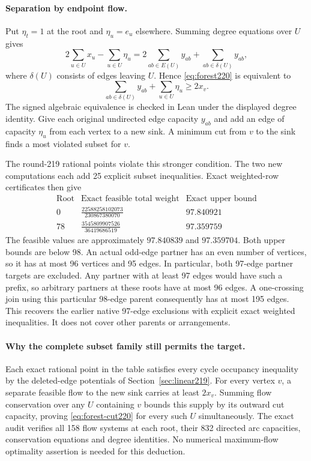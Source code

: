 \documentclass[11pt,a4paper]{article}
\theoremstyle{definition}
\theoremstyle{remark}
\begin{document}
\paragraph{Separation by endpoint flow.}
Put $\eta_t=1$ at the root and $\eta_u=e_u$ elsewhere. Summing degree
equations over $U$ gives
\[
2\sum_{u\in U}x_u-\sum_{u\in U}\eta_u
=2\sum_{ab\in E(U)}y_{ab}+\sum_{ab\in\delta(U)}y_{ab},
\]
where $\delta(U)$ consists of edges leaving $U$. Hence
\eqref{eq:forest220} is equivalent to
\begin{equation}\label{eq:forest-cut220}
\sum_{ab\in\delta(U)}y_{ab}+\sum_{u\in U}\eta_u\ge2x_v.
\end{equation}
The signed algebraic equivalence is checked in Lean under the displayed
degree identity. Give each original undirected edge capacity $y_{ab}$
and add an edge of capacity $\eta_u$ from each vertex to a new sink.
A minimum cut from $v$ to the sink finds a most violated subset for $v$.

The round-219 rational points violate this stronger condition.
The two new computations each add 25 explicit subset inequalities.
Exact weighted-row certificates then give
\[
\begin{array}{c|c|c}
\text{Root}&\text{Exact feasible total weight}&\text{Exact upper bound}\\\hline
0&\displaystyle\frac{22588258102073}{230867380070}&97.840921\\[6pt]
78&\displaystyle\frac{3545809907526}{36419686519}&97.359759
\end{array}
\]
The feasible values are approximately $97.840839$ and $97.359704$.
Both upper bounds are below 98. An actual odd-edge partner has an even
number of vertices, so it has at most 96 vertices and 95 edges.
In particular, both 97-edge partner targets are excluded. Any partner
with at least 97 edges would have such a prefix, so arbitrary partners
at these roots have at most 96 edges. A one-crossing join using this
particular 98-edge parent consequently has at most 195 edges.
This recovers the earlier native 97-edge exclusions with explicit exact
weighted inequalities. It does not cover other parents or arrangements.

\paragraph{Why the complete subset family still permits the target.}
Each exact rational point in the table satisfies every cycle occupancy
inequality by the deleted-edge potentials of Section~\ref{sec:linear219}.
For every vertex $v$, a separate feasible flow to the new sink carries
at least $2x_v$. Summing flow conservation over any $U$ containing $v$
bounds this supply by its outward cut capacity, proving
\eqref{eq:forest-cut220} for every such $U$ simultaneously.
The exact audit verifies all 158 flow systems at each root, their 832
directed arc capacities, conservation equations and degree identities.
No numerical maximum-flow optimality assertion is needed for this deduction.
\end{document}
